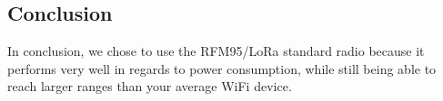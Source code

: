 \documentclass[onecolumn, draftclsnofoot,10pt, compsoc]{IEEEtran}
\begin{document}
    \subsection{Conclusion}
    In conclusion, we chose to use the RFM95/LoRa standard radio because it performs very well in regards to power consumption, while still being able to reach larger ranges than your average WiFi device.
    
    \pagebreak
    \nocite{*} %
    
    
    
\end{document}
